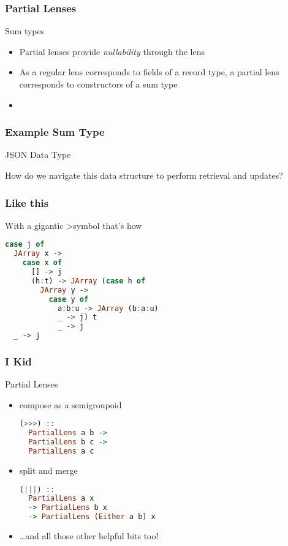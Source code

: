 \begin{frame}
\frametitle{Partial Lenses}

\begin{block}{Sum types}
\begin{itemize}
\item Partial lenses provide \emph{nullability} through the lens
\item As a regular lens corresponds to fields of a record type, a partial lens corresponds to constructors of a sum type
\item 
\end{itemize}
\end{block}

\end{frame}

\begin{frame}
\frametitle{Example Sum Type}

\begin{block}{JSON Data Type}

How do we navigate this data structure to perform retrieval and updates?
\end{block}

\end{frame}

\begin{frame}[fragile]
\frametitle{Like this}

\begin{block}{With a gigantic \textgreater symbol that's how}
\begin{lstlisting}[language=haskell]
case j of
  JArray x -> 
    case x of
      [] -> j
      (h:t) -> JArray (case h of 
        JArray y ->
          case y of
            a:b:u -> JArray (b:a:u)
            _ -> j) t
            _ -> j
  _ -> j
\end{lstlisting}
\end{block}

\end{frame}

\begin{frame}[fragile]
\frametitle{I Kid}

\begin{block}{Partial Lenses}
\begin{itemize}
\item compose as a semigroupoid
\begin{lstlisting}[language=haskell]
(>>>) ::
  PartialLens a b ->
  PartialLens b c ->
  PartialLens a c
\end{lstlisting}
\item split and merge
\begin{lstlisting}[language=haskell]
(|||) ::
  PartialLens a x
  -> PartialLens b x
  -> PartialLens (Either a b) x
\end{lstlisting}
\item \ldots and all those other helpful bits too!
\end{itemize}
\end{block}

\end{frame}

